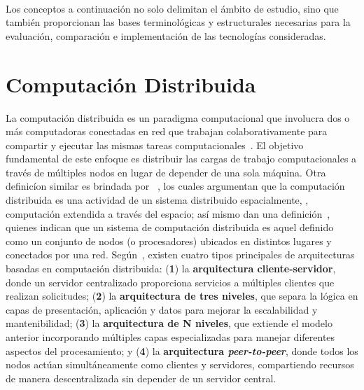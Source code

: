 \label{cap:marcoConceptual}
\mbox{}\\

\noindent
Los conceptos a continuación no solo delimitan el ámbito de estudio, sino que también proporcionan las bases terminológicas y estructurales necesarias para la evaluación, comparación e implementación de las tecnologías consideradas.

\noindent
\section{Computación Distribuida}
\noindent
La computación distribuida es un paradigma computacional que involucra dos o más computadoras conectadas en red que trabajan colaborativamente para compartir y ejecutar las mismas tareas computacionales~\citep{Ali2015}. El objetivo fundamental de este enfoque es distribuir las cargas de trabajo computacionales a través de múltiples nodos en lugar de depender de una sola máquina. Otra definicíon similar es brindada por ~\cite{Lamport1990}, los cuales argumentan que la computación distribuida es una actividad  de un sistema distribuido espacialmente, \ie, computación extendida a través del espacio; así mismo dan una definición~\cite{Chang1995}, quienes indican que un sistema de computación distribuida es aquel definido como un conjunto de nodos (o procesadores) ubicados en distintos lugares y conectados por una red. Según~\cite{AWS01}, existen cuatro tipos principales de arquitecturas basadas en computación distribuida: (\textbf{1}) la \textbf{arquitectura cliente-servidor}, donde un servidor centralizado proporciona servicios a múltiples clientes que realizan solicitudes; (\textbf{2}) la \textbf{arquitectura de tres niveles}, que separa la lógica en capas de presentación, aplicación y datos para mejorar la escalabilidad y mantenibilidad; (\textbf{3}) la \textbf{arquitectura de N niveles}, que extiende el modelo anterior incorporando múltiples capas especializadas para manejar diferentes aspectos del procesamiento; y (\textbf{4}) la \textbf{arquitectura \textit{peer-to-peer}}, donde todos los nodos actúan simultáneamente como clientes y servidores, compartiendo recursos de manera descentralizada sin depender de un servidor central.

